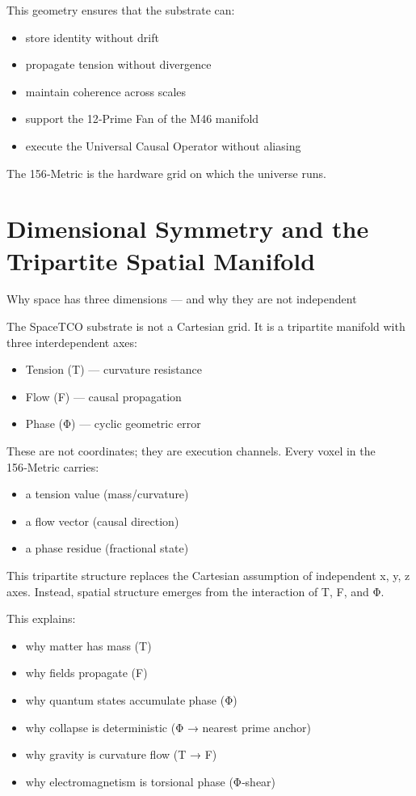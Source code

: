 \documentclass[reprint,amsmath,amssymb,aps,prl,floatfix]{revtex4-2}
\begin{document}
\begin{itemize}
This geometry ensures that the substrate can:
\begin{itemize}
\item store identity without drift  
\item propagate tension without divergence  
\item maintain coherence across scales  
\item support the 12‑Prime Fan of the M46 manifold  
\item execute the Universal Causal Operator without aliasing  
\end{itemize}
\medskip


The 156‑Metric is the hardware grid on which the universe runs.

\section{Dimensional Symmetry and the Tripartite Spatial Manifold}

Why space has three dimensions — and why they are not independent
\medskip


The SpaceTCO substrate is not a Cartesian grid.  
It is a tripartite manifold with three interdependent axes:
\begin{itemize}
\item Tension (T) — curvature resistance  
\item Flow (F) — causal propagation  
\item Phase (Φ) — cyclic geometric error  
\end{itemize}
\medskip


These are not coordinates; they are execution channels.  
Every voxel in the 156‑Metric carries:
\begin{itemize}
\item a tension value (mass/curvature)  
\item a flow vector (causal direction)  
\item a phase residue (fractional state)  
\end{itemize}

This tripartite structure replaces the Cartesian assumption of independent x, y, z axes. Instead, spatial structure emerges from the interaction of T, F, and Φ.
\medskip


This explains:
\begin{itemize}
\item why matter has mass (T)  
\item why fields propagate (F)  
\item why quantum states accumulate phase (Φ)  
\item why collapse is deterministic (Φ → nearest prime anchor)  
\item why gravity is curvature flow (T → F)  
\item why electromagnetism is torsional phase (Φ‑shear)  
\end{itemize}


\end{itemize}
\end{document}
